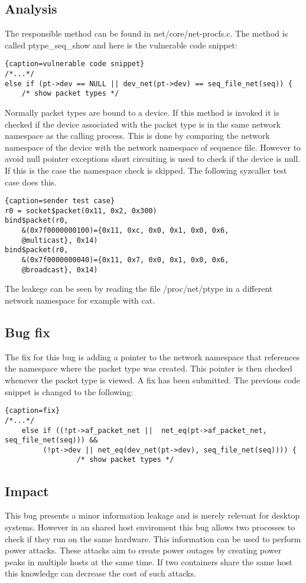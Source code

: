 \documentclass[10pt,twocolumn,a4paper]{article}
\begin{document}
\subsection{Analysis}
The responsible method can be found in net/core/net-procfs.c. The method is called ptype\_seq\_show
and here is the vulnerable code snippet:
\begin{lstlisting}{caption=vulnerable code snippet}
/*...*/
else if (pt->dev == NULL || dev_net(pt->dev) == seq_file_net(seq)) {
    /* show packet types */
\end{lstlisting}
Normally packet types are bound to a device. If this method is invoked it is checked if the device
associated with the packet type is in the same network namespace as the calling process. This is
done by comparing the network namespace of the device with the network namespace of sequence file.
However to avoid null pointer exceptions short circuiting is used to check if the device is null. If
this is the case the namespace check is skipped. The following syzcaller test case does this.
\begin{lstlisting}{caption=sender test case}
r0 = socket$packet(0x11, 0x2, 0x300)
bind$packet(r0, 
    &(0x7f0000000100)={0x11, 0xc, 0x0, 0x1, 0x0, 0x6,
    @multicast}, 0x14)
bind$packet(r0, 
    &(0x7f0000000040)={0x11, 0x7, 0x0, 0x1, 0x0, 0x6,
    @broadcast}, 0x14)
\end{lstlisting}
The leakege can be seen by reading the file /proc/net/ptype in a different network namespace for
example with cat.

\subsection{Bug fix}
The fix for this bug is adding a pointer to the network namespace that references the namespace
where the packet type was created. This pointer is then checked whenever the packet type is
viewed. A fix has been submitted.\cite{4}
The previous code snippet is changed to the following:
\begin{lstlisting}{caption=fix}
/*...*/
	else if ((!pt->af_packet_net ||  net_eq(pt->af_packet_net, seq_file_net(seq))) &&
		 (!pt->dev || net_eq(dev_net(pt->dev), seq_file_net(seq)))) {
                 /* show packet types */
\end{lstlisting}
\cite{4}
\subsection{Impact}
This bug presents a minor information leakage and is merely relevant for desktop systems.
However in an shared host enviroment this bug allows two processes to check if they run on the same
hardware. This information can be used to perform power attacks. These attacks aim to create power
outages by creating power peaks in multiple hosts at the same time. If two containers share the same
host this knowledge can decrease the cost of such attacks\cite{7}.
\end{document}
